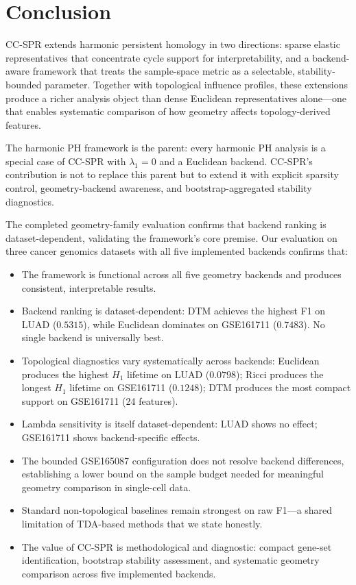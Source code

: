 \documentclass[11pt]{article}
\begin{document}
\section{Conclusion}
\label{sec:conclusion}

CC-SPR extends harmonic persistent homology in two directions: sparse elastic representatives that concentrate cycle support for interpretability, and a backend-aware framework that treats the sample-space metric as a selectable, stability-bounded parameter.
Together with topological influence profiles, these extensions produce a richer analysis object than dense Euclidean representatives alone---one that enables systematic comparison of how geometry affects topology-derived features.

The harmonic PH framework is the parent: every harmonic PH analysis is a special case of CC-SPR with $\lambda_1 = 0$ and a Euclidean backend.
CC-SPR's contribution is not to replace this parent but to extend it with explicit sparsity control, geometry-backend awareness, and bootstrap-aggregated stability diagnostics.

The completed geometry-family evaluation confirms that backend ranking is dataset-dependent, validating the framework's core premise.
Our evaluation on three cancer genomics datasets with all five implemented backends confirms that:
\begin{itemize}[leftmargin=1.5em]
\item The framework is functional across all five geometry backends and produces consistent, interpretable results.
\item Backend ranking is dataset-dependent: DTM achieves the highest F1 on LUAD ($0.5315$), while Euclidean dominates on GSE161711 ($0.7483$).
No single backend is universally best.
\item Topological diagnostics vary systematically across backends: Euclidean produces the highest $H_1$ lifetime on LUAD ($0.0798$); Ricci produces the longest $H_1$ lifetime on GSE161711 ($0.1248$); DTM produces the most compact support on GSE161711 (24 features).
\item Lambda sensitivity is itself dataset-dependent: LUAD shows no effect; GSE161711 shows backend-specific effects.
\item The bounded GSE165087 configuration does not resolve backend differences, establishing a lower bound on the sample budget needed for meaningful geometry comparison in single-cell data.
\item Standard non-topological baselines remain strongest on raw F1---a shared limitation of TDA-based methods that we state honestly.
\item The value of CC-SPR is methodological and diagnostic: compact gene-set identification, bootstrap stability assessment, and systematic geometry comparison across five implemented backends.
\end{itemize}
\end{document}
